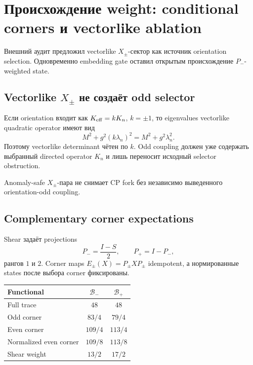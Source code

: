 \chapter{Происхождение weight: conditional corners и vectorlike ablation}

Внешний аудит предложил vectorlike \(X_\pm\)-сектор как источник orientation
selection. Одновременно embedding gate оставил открытым происхождение
\(P_-\)-weighted state.

\section{Vectorlike \texorpdfstring{\(X_\pm\)}{X+/-} не создаёт odd selector}

Если orientation входит как \(K_{\rm eff}=kK_n\), \(k=\pm1\), то eigenvalues
vectorlike quadratic operator имеют вид
\begin{equation}
 M^2+g^2(k\lambda_n)^2=M^2+g^2\lambda_n^2.
\end{equation}
Поэтому vectorlike determinant чётен по \(k\). Odd coupling должен уже
содержать выбранный directed operator \(K_n\) и лишь переносит исходный
selector obstruction.

\begin{proposition}
Anomaly-safe \(X_\pm\)-пара не снимает CP fork без независимо выведенного
orientation-odd coupling.
\end{proposition}

\section{Complementary corner expectations}

Shear задаёт projections
\begin{equation}
 P_-=\frac{I-S}{2},\qquad P_+=I-P_-,
\end{equation}
рангов \(1\) и \(2\). Corner maps \(E_\pm(X)=P_\pm XP_\pm\) idempotent, а
нормированные states после выбора corner фиксированы.

\begin{center}
\begin{tabular}{lcc}
\toprule
Functional & \(\mathcal B_-\) & \(\mathcal B_+\)\\
\midrule
Full trace & \(48\) & \(48\)\\
Odd corner & \(83/4\) & \(79/4\)\\
Even corner & \(109/4\) & \(113/4\)\\
Normalized even corner & \(109/8\) & \(113/8\)\\
Shear weight & \(13/2\) & \(17/2\)\\
\bottomrule
\end{tabular}
\end{center}

